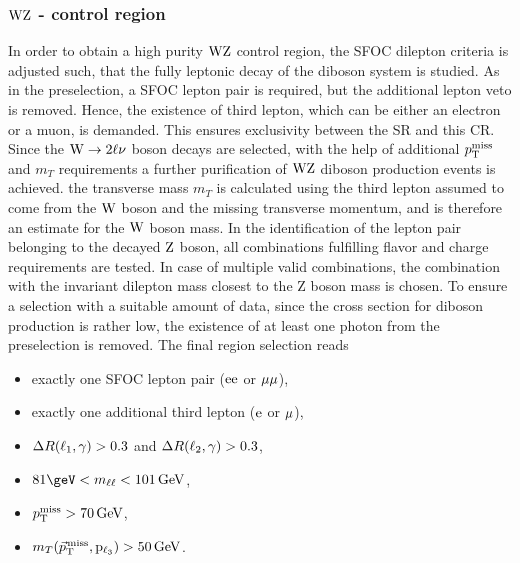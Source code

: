 \subsubsection*{$\mathrm{W}\mathrm{Z}$ - control region}
In order to obtain a high purity $\mathrm{W}\mathrm{Z}$ control region, the SFOC dilepton criteria is adjusted such, that the fully leptonic decay of the diboson system is studied. As in the preselection, a SFOC lepton pair is required, but the additional lepton veto is removed. Hence, the existence of third lepton, which can be either an electron or a muon, is demanded. This ensures exclusivity between the SR and this CR. Since the $\mathrm{W}\to2\ell\nu$ boson decays are selected, with the help of additional $p_{\mathrm{T}}^\text{miss}$ and $m_{T}$ requirements a further purification of $\mathrm{W}\mathrm{Z}$ diboson production events is achieved. the transverse mass $m_{T}$ is calculated using the third lepton assumed to come from the $\mathrm{W}$ boson and the missing transverse momentum, and is therefore an estimate for the $\mathrm{W}$ boson mass. In the identification of the lepton pair belonging to the decayed $\mathrm{Z}$ boson, all combinations fulfilling flavor and charge requirements are tested. In case of multiple valid combinations, the combination with the invariant dilepton mass closest to the Z boson mass is chosen. To ensure a selection with a suitable amount of data, since the cross section for diboson production is rather low, the existence of at least one photon from the preselection is removed. The final region selection reads
\begin{itemize}
 \item exactly one SFOC lepton pair ($\mathrm{e}\mathrm{e}$ or $\mu\mu$),
 \item exactly one additional third lepton ($\mathrm{e}$ or ${\mu}$),
 \item $\Delta R(\ell_1,\gamma)>0.3$ and $\Delta R(\ell_2,\gamma)>0.3$,
 \item $81\geV<m_{\ell\ell}<101\GeV$,
 \item $p_{\mathrm{T}}^\text{miss}>70\,\text{Ge\hspace{-.08em}V}$,
 \item $m_{T}({\vec p}_{\mathrm{T}}^{\kern1pt\text{miss}},\mathrm{p_{\ell_3}})>50\,\text{Ge\hspace{-.08em}V}$.
\end{itemize}
